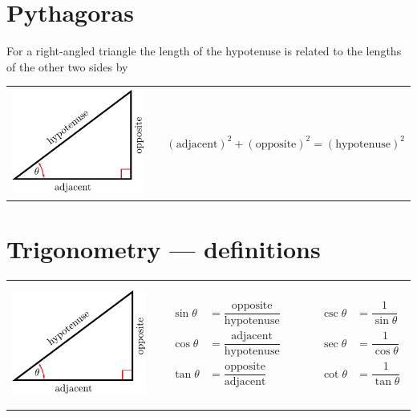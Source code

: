 \section{Pythagoras}
For a right-angled triangle the length of the hypotenuse is related to the lengths of the other two sides by
\begin{center}
\begin{tabular}{m{4cm}cm{9cm}}
  \includegraphics[height=3.5cm]{right_triangle} &\qquad &
$(\text{adjacent})^2+(\text{opposite})^2 = (\text{hypotenuse})^2$
\end{tabular}
\end{center}
\section{Trigonometry --- definitions}
\begin{center}
\begin{tabular}{m{6cm}cm{8cm}}
  \includegraphics[height=4cm]{right_triangle} & \qquad&
$
\begin{array}{rlcrl}
\sin\theta &= \dfrac{\text{opposite}}{\text{hypotenuse}} & \qquad & \csc \theta &= \dfrac{1}{\sin\theta} \\[3ex]
\cos\theta &= \dfrac{\text{adjacent}}{\text{hypotenuse}} & \qquad & \sec \theta &= \dfrac{1}{\cos\theta} \\[3ex]
\tan\theta &= \dfrac{\text{opposite}}{\text{adjacent}} & \qquad & \cot \theta &= \dfrac{1}{\tan\theta}
\end{array}
$
\end{tabular}
\end{center}

